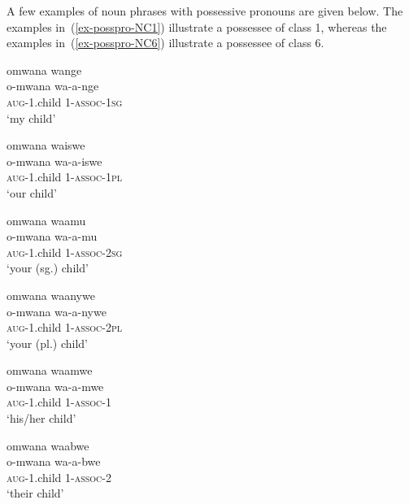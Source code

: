 A few examples of noun phrases with possessive pronouns are given below. 
The examples in~(\ref{ex-posspro-NC1}) illustrate a possessee of class 1, whereas the examples in~(\ref{ex-posspro-NC6}) illustrate a possessee of class 6. 

\ea \label{ex-posspro-NC1}
\begin{xlist}
\begin{multicols}{2}
    \ex 
    \glll   omwana wange\\
            o-mwana wa-a-nge \\
 	\textsc{aug}-1.child 1-\textsc{assoc}-\textsc{1sg}\\
    \glt  ‘my child’ 

    \ex 
    \glll   omwana waiswe\\
            o-mwana wa-a-iswe\\
 	 \textsc{aug}-1.child 1-\textsc{assoc}-\textsc{1pl}\\
    \glt  ‘our child’ 
    
  \ex 
    \glll   omwana waamu\\
            o-mwana wa-a-mu\\
 	 \textsc{aug}-1.child 1-\textsc{assoc}-\textsc{2sg}\\
    \glt  ‘your (sg.) child’ 

  \ex
    \glll   omwana waanywe\\
        o-mwana wa-a-nywe\\
 	 \textsc{aug}-1.child 1-\textsc{assoc}-\textsc{2pl}\\
    \glt  ‘your (pl.) child’ 

\ex
    \glll   omwana waamwe\\
            o-mwana wa-a-mwe\\
 	 \textsc{aug}-1.child 1-\textsc{assoc}-1\\
    \glt  ‘his/her child’ 

\ex 
    \glll   omwana waabwe\\
            o-mwana wa-a-bwe\\
 	 \textsc{aug}-1.child 1-\textsc{assoc}-2\\
    \glt  ‘their child’ 
        
\end{multicols}
\end{xlist}	
\z
  
